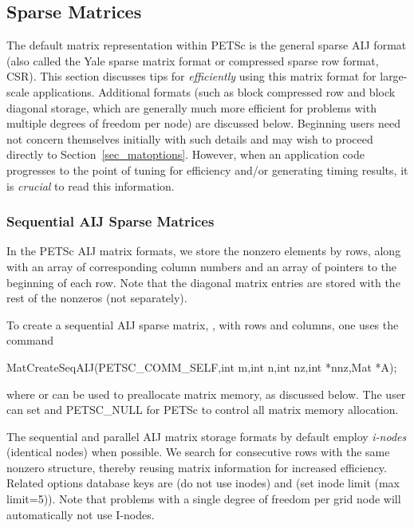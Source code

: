 \subsection{Sparse Matrices}
\label{sec_matsparse}

 
The default matrix representation within PETSc is the general sparse
AIJ format (also called the Yale sparse matrix format or compressed
sparse row format, CSR).  This section discusses tips for {\em
efficiently} using this matrix format for large-scale
applications. Additional formats (such as block compressed row and
block diagonal storage, which are generally much more efficient for
problems with multiple degrees of freedom per node) are discussed
below.  Beginning users need not concern themselves initially with
such details and may wish to proceed directly to
Section~\ref{sec_matoptions}.  However, when an application code
progresses to the point of tuning for efficiency and/or generating
timing results, it is {\em crucial} to read this information.

\subsubsection{Sequential AIJ Sparse Matrices}

In the PETSc AIJ matrix formats, we store the nonzero elements
by rows, along with an array of corresponding column numbers and
an array of pointers to the beginning of each row.  Note that the
diagonal matrix entries are stored with the rest of the nonzeros (not
separately). 

To create a sequential AIJ sparse matrix, , 
with  rows and  columns,
one uses the command
\begin{tabbing}
  MatCreateSeqAIJ(PETSC_COMM_SELF,int m,int n,int nz,int *nnz,Mat *A);
\end{tabbing}
where  or  can be used to preallocate matrix memory,
as discussed below. The user can set  and PETSC_NULL for PETSc to control all matrix memory allocation.

The sequential and parallel AIJ matrix storage formats by default
employ {\em i-nodes} (identical nodes) when possible.  We search for
consecutive rows with the same nonzero structure, thereby reusing
matrix information for increased efficiency.  Related options database
keys are  (do not use inodes) and  (set inode limit (max limit=5)).
Note that problems with a single degree of freedom per grid node
will automatically not use I-nodes.

